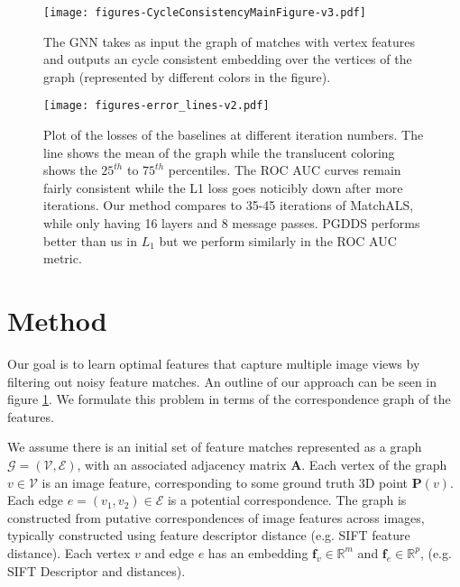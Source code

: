 \documentclass[10pt,twocolumn,letterpaper]{article}
\newcommand{\bR}{\mathbb{R}}
\newcommand{\mat}[1]{\mathbf{#1}}
\begin{document}
\begin{figure}[t]
\begin{center}
  \texttt{[image: figures-CycleConsistencyMainFigure-v3.pdf]}
\end{center}
  \caption{
    The GNN \cite{battaglia2018relational} takes as input the graph of matches with vertex features and outputs an cycle consistent embedding over the vertices of the graph (represented by different colors in the figure).
  }
\label{fig:pipeline}
\vspace{-1em}
\end{figure}

\begin{figure*}[h]
\begin{center}
  \texttt{[image: figures-error\_lines-v2.pdf]}
  \end{center}
     \caption{
         Plot of the losses of the baselines at different iteration numbers.
         The line shows the mean of the graph while the translucent coloring shows the $25^{th}$ to $75^{th}$ percentiles.
         The ROC AUC curves remain fairly consistent while the L1 loss goes noticibly down after more iterations.
         Our method compares to 35-45 iterations of MatchALS, while only having 16 layers and 8 message passes.
         PGDDS performs better than us in $L_1$ but we perform similarly in the ROC AUC metric.
     }
  \label{fig:errorlines}
\end{figure*}


\section{Method}
Our goal is to learn optimal features that capture multiple image views by filtering out noisy feature matches.
An outline of our approach can be seen in figure \ref{fig:pipeline}.
We formulate this problem in terms of the correspondence graph of the features.

We assume there is an initial set of feature matches represented as a graph $\mathcal{G} = (\mathcal{V}, \mathcal{E})$, with an associated adjacency matrix $\mat{A}$.
Each vertex of the graph $v \in \mathcal{V}$ is an image feature, corresponding to some ground truth 3D point $\mat{P}(v)$.
Each edge $e = (v_1, v_2) \in \mathcal{E}$ is a potential correspondence.
The graph is constructed from putative correspondences of image features across images, typically constructed using feature descriptor distance (e.g. SIFT feature distance).
Each vertex $v$ and edge $e$ has an embedding $\mat{f}_v \in \bR^m$ and $\mat{f}_e \in \bR^p$, (e.g. SIFT Descriptor and distances).
\end{document}
